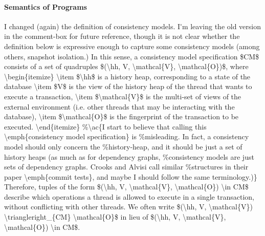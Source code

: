 \paragraph{Semantics of Programs}
\label{sec:semantics.programs}

\ac{
I changed (again) the definition of consistency models. I'm leaving the old 
version in the comment-box for future reference, though it is not clear 
whether the definition below is expressive enough to capture some consistency models (among 
others, snapshot isolation.)

In this sense, a consistency model specification $CM$ consists of a set of quadruples 
$(\hh, V, \mathcal{V}, \mathcal{O})$, where 
\begin{itemize}
\item $\hh$ is a history heap, corresponding to a state of the database
\item $V$ is the view of the history heap of the thread that wants to execute a 
transaction, 
\item $\mathcal{V}$ is the multi-set of views of the external environment (i.e. other 
threads that may be interacting with the database), 
\item $\mathcal{O}$ is the fingerprint of the transaction to be executed.
\end{itemize}

Therefore, tuples of the form $(\hh, V, \mathcal{V}, \mathcal{O}) \in CM$ describe 
which operations a thread is allowed to execute in a single transaction, without conflicting 
with other threads. We often write $(\hh, V, \mathcal{V}) \triangleright_{CM} \mathcal{O}$ 
in lieu of $(\hh, V, \mathcal{V}, \mathcal{O}) \in CM$. }
